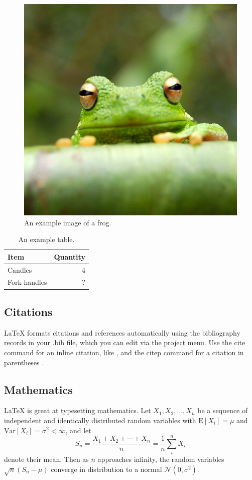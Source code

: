 \documentclass[fleqn,10pt]{olplainarticle}
\begin{document}
\begin{figure}[ht]
\centering
\includegraphics[width=0.7\linewidth]{frog}
\caption{An example image of a frog.}
\label{fig:view}
\end{figure}

\begin{table}[ht]
\centering
\begin{tabular}{l|r}
Item & Quantity \\\hline
Candles & 4 \\
Fork handles & ?  
\end{tabular}
\caption{\label{tab:widgets}An example table.}
\end{table}

\subsection*{Citations}

LaTeX formats citations and references automatically using the bibliography records in your .bib file, which you can edit via the project menu. Use the cite command for an inline citation, like \cite{Bradley2022SESgap}, and the citep command for a citation in parentheses \citep{Bradley2022SESgap}.

\subsection*{Mathematics}

\LaTeX{} is great at typesetting mathematics. Let $X_1, X_2, \ldots, X_n$ be a sequence of independent and identically distributed random variables with $\text{E}[X_i] = \mu$ and $\text{Var}[X_i] = \sigma^2 < \infty$, and let
$$S_n = \frac{X_1 + X_2 + \cdots + X_n}{n}
      = \frac{1}{n}\sum_{i}^{n} X_i$$
denote their mean. Then as $n$ approaches infinity, the random variables $\sqrt{n}(S_n - \mu)$ converge in distribution to a normal $\mathcal{N}(0, \sigma^2)$.
\end{document}
